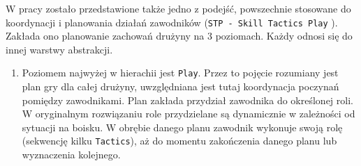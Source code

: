 W pracy zostało przedstawione także jedno z podejść, powszechnie stosowane do koordynacji i planowania działań zawodników (\mbox{\texttt{STP - Skill Tactics Play}} \cite{stp}).
Zakłada ono planowanie zachowań drużyny na $3$ poziomach. Każdy odnosi się do innej warstwy abstrakcji.
\begin{enumerate} 
  \item Poziomem najwyżej w hierachii jest \texttt{Play}. Przez to pojęcie rozumiany jest plan gry dla całej drużyny, uwzględniana jest tutaj koordynacja
  poczynań pomiędzy zawodnikami. Plan zakłada przydział zawodnika do określonej roli. W oryginalnym rozwiązaniu role przydzielane są dynamicznie w zależności od sytuacji na boisku.
  W obrębie danego planu zawodnik wykonuje swoją rolę (sekwencję kilku \texttt{Tactics}), aż do momentu zakończenia danego planu lub wyznaczenia kolejnego.
  

\end{enumerate}
